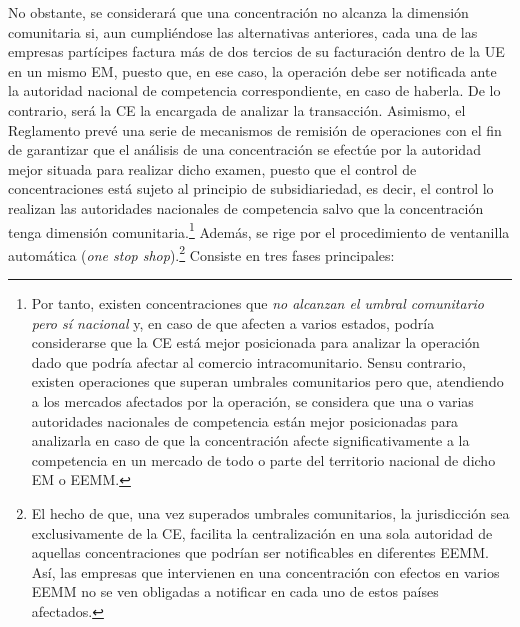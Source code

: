\documentclass[10pt,a4paper]{article}
\begin{document}
{No obstante, se considerará que una concentración no alcanza la dimensión comunitaria si, aun cumpliéndose las alternativas anteriores, cada una de las empresas partícipes factura más de dos tercios de su facturación dentro de la UE en un mismo EM, puesto que, en ese caso, la operación debe ser notificada ante la autoridad nacional de competencia correspondiente, en caso de haberla. De lo contrario, será la CE la encargada de analizar la transacción.
} Asimismo, el Reglamento prevé una serie de mecanismos de remisión de operaciones con el fin de garantizar que el análisis de una concentración se efectúe por la autoridad mejor situada para realizar dicho examen, puesto que el control de concentraciones está sujeto al principio de subsidiariedad, es decir, el control lo realizan las autoridades nacionales de competencia salvo que la concentración tenga dimensión comunitaria.\footnote{%
    Por tanto, existen concentraciones que \textit{no alcanzan el umbral comunitario pero sí nacional} y, en caso de que afecten a varios estados, podría considerarse que la CE está mejor posicionada para analizar la operación dado que podría afectar al comercio intracomunitario. Sensu contrario, existen operaciones que superan umbrales comunitarios pero que, atendiendo a los mercados afectados por la operación, se considera que una o varias autoridades nacionales de competencia están mejor posicionadas para analizarla en caso de que la concentración afecte significativamente a la competencia en un mercado de todo o parte del territorio nacional de dicho EM o EEMM.
} Además, se rige por el procedimiento de ventanilla automática (\textit{one stop shop}).\footnote{%
    El hecho de que, una vez superados umbrales comunitarios, la jurisdicción sea exclusivamente de la CE, facilita la centralización en una sola autoridad de aquellas concentraciones que podrían ser notificables en diferentes EEMM. Así, las empresas que intervienen en una concentración con efectos en varios EEMM no se ven obligadas a notificar en cada uno de estos países afectados.
} Consiste en tres fases principales:
\end{document}
